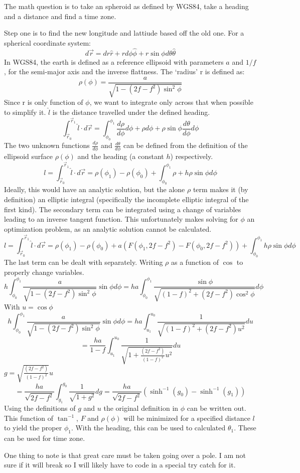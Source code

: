 \documentclass[10pt,a4paper]{letter}
\author{Ian Faust}
\begin{document}
The math question is to take an spheroid as defined by WGS84, take a heading and a distance and find a time zone.

Step one is to find the new longitude and lattiude based off the old one. For a spherical coordinate system:
\[
d\vec{r} = dr\hat{r} + r d\phi\hat{\phi} + r \sin \phi d\theta\hat{\theta}
\]
In WGS84, the earth is defined as a reference ellipsoid with parameters $a$ and $1/f$, for the semi-major axis and the inverse flattness. The `radius' r is defined as:
\[
	\rho(\phi) = \frac{a}{\sqrt{1-(2f-f^2)\sin^2\phi}}
\]
Since r is only function of $\phi$, we want to integrate only across that when possible to simplify it. $\hat{l}$ is the distance travelled under the defined heading.
\[
\int_{\vec{r}_0}^{\vec{r}_1} \hat{l} \cdot d\vec{r} = \int_{\phi_0}^{\phi_1} \frac{d\rho}{d\phi}d\phi + \rho d\phi + \rho \sin \phi \frac{d\theta}{d\phi}d\phi
\]
The two unknown functions $\frac{d\rho}{d\phi}$ and $\frac{d\theta}{d\phi}$ can be defined from the definition of the ellipsoid surface $\rho(\phi)$ and the heading (a constant $h$) respectively.
\[
l = \int_{\vec{r}_0}^{\vec{r}_1} \hat{l} \cdot d\vec{r} = \rho(\phi_1) - \rho(\phi_0) + \int_{\phi_0}^{\phi_1} \rho + h\rho \sin \phi d\phi
\]
Ideally, this would have an analytic solution, but the alone $\rho$ term makes it (by definition) an elliptic integral (specifically the incomplete elliptic integral of the first kind).  The secondary term can be integrated using a change of variables leading to an inverse tangent function.  This unfortunately makes solving for $\phi$ an optimization problem, as an analytic solution cannot be calculated.
\[
l = \int_{\vec{r}_0}^{\vec{r}_1} \hat{l} \cdot d\vec{r} = \rho(\phi_1) - \rho(\phi_0) + a(F(\phi_1,2f-f^2) - F(\phi_0,2f-f^2))  + \int_{\phi_0}^{\phi_1} h\rho \sin \phi d\phi
\]
The last term can be dealt with separately.  Writing $\rho$ as a function of $\cos$ to properly change variables.
\[
h\int_{\phi_0}^{\phi_1} \frac{a}{\sqrt{1-(2f-f^2)\sin^2\phi}} \sin \phi d\phi = ha\int_{\phi_0}^{\phi_1} \frac{\sin \phi}{\sqrt{(1-f)^2+(2f-f^2)\cos^2\phi}}d\phi
\]
With $u = \cos \phi$
\[
h\int_{\phi_0}^{\phi_1} \frac{a}{\sqrt{1-(2f-f^2)\sin^2\phi}} \sin \phi d\phi = ha\int_{u_1}^{u_0} \frac{1}{\sqrt{(1-f)^2+(2f-f^2)u^2}}du
\]
\[
= \frac{ha}{1-f} \int_{u_1}^{u_0} \frac{1}{\sqrt{1+\frac{(2f-f^2)}{(1-f)^2}u^2}}du
\]
$g  = \sqrt{\frac{(2f-f^2)}{(1-f)^2}}u$
\[
= \frac{ha}{\sqrt{2f-f^2}} \int_{g_1}^{g_0} \frac{1}{\sqrt{1+g^2}}dg= \frac{ha}{\sqrt{2f-f^2}}(\sinh^{-1}(g_0) - \sinh^{-1}(g_1))
\]
Using the definitions of $g$ and $u$ the original definition in $\phi$ can be written out.  This function of $\tan^{-1}$, $F$ and $\rho(\phi)$ will be minimized for a specified distance $l$ to yield the proper $\phi_1$.  With the heading, this can be used to calculated $\theta_1$. These can be used for time zone.

One thing to note is that great care must be taken going over a pole. I am not sure if it will break so I will likely have to code in a special try catch for it. 
\end{document}
